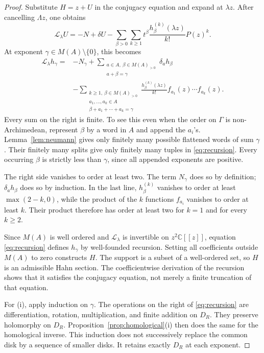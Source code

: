 \documentclass[11pt,a4paper]{article}
\numberwithin{equation}{section}
\theoremstyle{definition}
\theoremstyle{remark}
\newcommand{\C}{\mathbb C}
\newcommand{\LL}{\mathcal L}
\begin{document}
\begin{proof}
Substitute $H=z+U$ in the conjugacy equation and expand at $\lambda z$.
After cancelling $\Lambda z$, one obtains
\begin{equation}\label{eq:masterrecursion}
 \LL_\lambda U
 =-N+\delta U-
 \sum_{\beta>0}\sum_{k\ge1}
 t^\beta\frac{h_\beta^{(k)}(\lambda z)}{k!}P(z)^k.
\end{equation}
At exponent $\gamma\in M(A)\setminus\{0\}$, this becomes
\begin{equation}\label{eq:recursion}
 \begin{split}
 \LL_\lambda h_\gamma={}&-N_\gamma
 +\sum_{\substack{a\in A,\ \beta\in M(A)_{>0}\\a+\beta=\gamma}}
                 \delta_a h_\beta\\
 &-\sum_{\substack{k\ge1,\ \beta\in M(A)_{>0}\\
                  a_1,\ldots,a_k\in A\\
                  \beta+a_1+\cdots+a_k=\gamma}}
       \frac{h_\beta^{(k)}(\lambda z)}{k!}
       f_{a_1}(z)\cdots f_{a_k}(z).
 \end{split}
\end{equation}
Every sum on the right is finite. To see this even when the order on
$\Gamma$ is non-Archimedean, represent $\beta$ by a word in $A$ and append
the $a_i$'s. Lemma~\ref{lem:neumann} gives only finitely many possible
flattened words of sum $\gamma$. Their finitely many splits give only
finitely many tuples in \eqref{eq:recursion}. Every occurring $\beta$
is strictly less than $\gamma$, since all appended exponents are positive.

The right side vanishes to order at least two. The term $N_\gamma$ does so
by definition; $\delta_a h_\beta$ does so by induction. In the last line,
$h_\beta^{(k)}$ vanishes to order at least $\max(2-k,0)$, while the product
of the $k$ functions $f_{a_i}$ vanishes to order at least $k$. Their product
therefore has order at least two for $k=1$ and for every $k\ge2$.

Since $M(A)$ is well ordered and $\LL_\lambda$ is invertible on
$z^2\C[[z]]$, equation \eqref{eq:recursion} defines $h_\gamma$ by
well-founded recursion. Setting all coefficients outside $M(A)$ to zero
constructs $H$. The support is a subset of a well-ordered set, so $H$ is
an admissible Hahn section. The coefficientwise derivation of the recursion
shows that it satisfies the conjugacy equation, not merely a finite
truncation of that equation.

For (i), apply induction on $\gamma$. The operations on the right of
\eqref{eq:recursion} are differentiation, rotation, multiplication, and
finite addition on $D_R$. They preserve holomorphy on $D_R$.
Proposition~\ref{prop:homological}(i) then does the same for the
homological inverse. This induction does not successively replace the
common disk by a sequence of smaller disks. It retains exactly $D_R$
at each exponent.


\end{proof}
\end{document}

